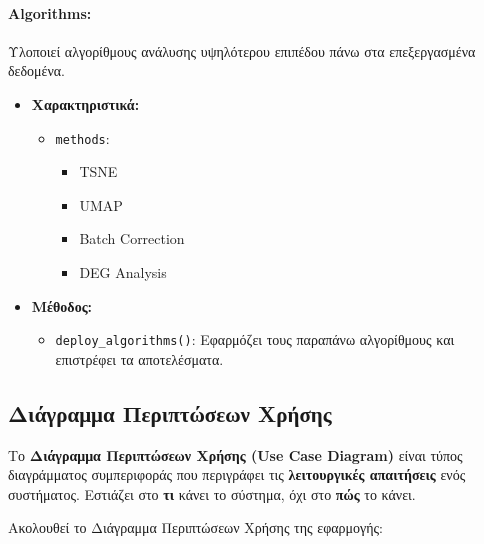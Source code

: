 \documentclass{article}  %
\begin{document}
\paragraph{Algorithms:}
Υλοποιεί αλγορίθμους ανάλυσης υψηλότερου επιπέδου πάνω στα επεξεργασμένα δεδομένα.
\begin{itemize}
  \item \textbf{Χαρακτηριστικά:}
  \begin{itemize}
    \item \texttt{methods}:
    \begin{itemize}
      \item TSNE
      \item UMAP
      \item Batch Correction
      \item DEG Analysis
    \end{itemize}
  \end{itemize}
  \item \textbf{Μέθοδος:}
  \begin{itemize}
    \item \texttt{deploy\_algorithms()}: Εφαρμόζει τους παραπάνω αλγορίθμους και επιστρέφει τα αποτελέσματα.
  \end{itemize}
\end{itemize}

\subsection{Διάγραμμα Περιπτώσεων Χρήσης}

Το \textbf{Διάγραμμα Περιπτώσεων Χρήσης (Use Case Diagram)} είναι τύπος διαγράμματος συμπεριφοράς που περιγράφει τις \textbf{λειτουργικές απαιτήσεις} ενός συστήματος. Εστιάζει στο \textbf{τι} κάνει το σύστημα, όχι στο \textbf{πώς} το κάνει.

\noindent Ακολουθεί το Διάγραμμα Περιπτώσεων Χρήσης της εφαρμογής:

\vspace{1em}
\end{document}
